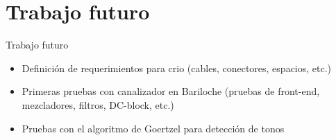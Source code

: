 \documentclass[ignorenonframetext,12pt]{beamer}
\begin{document}
		\section{Trabajo futuro}
		\begin{frame}{Trabajo futuro}
			\begin{itemize}
				\item Definici\'on de requerimientos para crio (cables,
					conectores, espacios, etc.)
				\item Primeras pruebas con canalizador en Bariloche (pruebas de
					front-end, mezcladores, filtros, DC-block, etc.)
				\item Pruebas con el algoritmo de Goertzel para detección de
					tonos
			\end{itemize}
		\end{frame}




	
\end{document}
